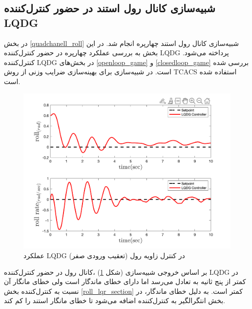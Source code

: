 \subsection{شبیه‌سازی کانال رول استند در حضور کنترل‌کننده LQDG}
در بخش
\ref{quadchanell_roll}
شبیه‌سازی کانال رول استند چهارپره انجام شد. در این بخش به بررسی عملکرد چهارپره در حضور کنترل‌کننده LQDG پرداخته می‌شود. کنترل‌کننده LQDG در بخش‌های
\ref{openloop_game}
و
\ref{closedloop_game}
بررسی شده است.
 در شبیه‌سازی برای بهینه‌سازی ضرایب وزنی از روش
TCACS \cite{Karimi2010}
استفاده شده است.
\begin{figure}[H]\label{lqdg_roll_fig}
	\includegraphics[width=12cm]{../Figures/MIL/LQDG/Roll/lqdg_roll.png}
	\centering
	\caption{عملكرد LQDG در کنترل زاويه رول (تعقیب ورودی صفر)}
\end{figure}
بر اساس خروجی شبیه‌سازی (شکل
\ref{lqdg_roll_fig})
،کانال رول در حضور کنترل‌کننده LQDG در کمتر از پنج ثانیه به تعادل می‌رسد اما دارای خطای ماندگار است ولی خطای مانگار آن نسبت به کنترل‌کننده بخش
\ref{roll_lqr_section}
کمتر است. به دلیل خطای ماندگار، در بخش
انتگرالگیر به کنترل‌کننده اضافه می‌شود تا خطای مانگار استند را کم کند.
